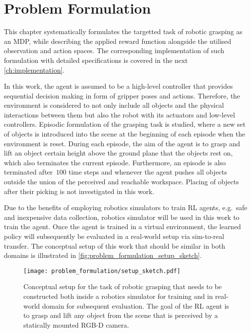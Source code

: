 \chapter{Problem Formulation}\label{ch:problem_formulation}

This chapter systematically formulates the targetted task of robotic grasping as an MDP, while describing the applied reward function alongside the utilised observation and action spaces. The corresponding implementation of such formulation with detailed specifications is covered in the next \autoref{ch:implementation}.

In this work, the agent is assumed to be a high-level controller that provides sequential decision making in form of gripper poses and actions. Therefore, the environment is considered to not only include all objects and the physical interactions between them but also the robot with its actuators and low-level controllers. Episodic formulation of the grasping task is studied, where a new set of objects is introduced into the scene at the beginning of each episode when the environment is reset. During each episode, the aim of the agent is to grasp and lift an object certain height above the ground plane that the objects rest on, which also terminates the current episode. Furthermore, an episode is also terminated after~\(100\) time steps and whenever the agent pushes all objects outside the union of the perceived and reachable workspace. Placing of objects after their picking is not investigated in this work.

Due to the benefits of employing robotics simulators to train RL agents, e.g.~safe and inexpensive data collection, robotics simulator will be used in this work to train the agent. Once the agent is trained in a virtual environment, the learned policy will subsequently be evaluated in a real-world setup via sim-to-real transfer. The conceptual setup of this work that should be similar in both domains is illustrated in \autoref{fig:problem_formulation_setup_sketch}.

\begin{figure}[ht]
    \centering
    \texttt{[image: problem\_formulation/setup\_sketch.pdf]}
    \caption{Conceptual setup for the task of robotic grasping that needs to be constructed both inside a robotics simulator for training and in real-world domain for subsequent evaluation. The goal of the RL agent is to grasp and lift any object from the scene that is perceived by a statically mounted RGB-D camera.}
    \label{fig:problem_formulation_setup_sketch}
\end{figure}


